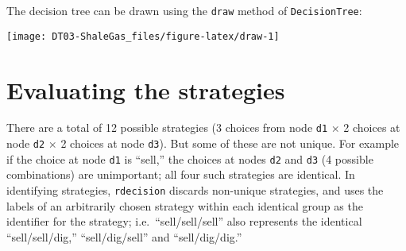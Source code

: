 \documentclass[
]{article}
\newenvironment{Shaded}{\begin{snugshade}}{\end{snugshade}}
\newcommand{\AttributeTok}[1]{\textcolor[rgb]{0.77,0.63,0.00}{#1}}
\newcommand{\CommentTok}[1]{\textcolor[rgb]{0.56,0.35,0.01}{\textit{#1}}}
\newcommand{\DecValTok}[1]{\textcolor[rgb]{0.00,0.00,0.81}{#1}}
\newcommand{\FunctionTok}[1]{\textcolor[rgb]{0.00,0.00,0.00}{#1}}
\newcommand{\NormalTok}[1]{#1}
\newcommand{\OtherTok}[1]{\textcolor[rgb]{0.56,0.35,0.01}{#1}}
\newcommand{\SpecialCharTok}[1]{\textcolor[rgb]{0.00,0.00,0.00}{#1}}
\newcommand{\StringTok}[1]{\textcolor[rgb]{0.31,0.60,0.02}{#1}}
\begin{document}
\begin{Shaded}
\end{Shaded}

The decision tree can be drawn using the \texttt{draw} method of
\texttt{DecisionTree}:

\begin{center}\texttt{[image: DT03-ShaleGas\_files/figure-latex/draw-1]} \end{center}

\hypertarget{evaluating-the-strategies}{%
\section{Evaluating the strategies}\label{evaluating-the-strategies}}

There are a total of 12 possible strategies (3 choices from node
\texttt{d1} \(\times\) 2 choices at node \texttt{d2} \(\times\) 2
choices at node \texttt{d3}). But some of these are not unique. For
example if the choice at node \texttt{d1} is ``sell,'' the choices at
nodes \texttt{d2} and \texttt{d3} (4 possible combinations) are
unimportant; all four such strategies are identical. In identifying
strategies, \texttt{rdecision} discards non-unique strategies, and uses
the labels of an arbitrarily chosen strategy within each identical group
as the identifier for the strategy; i.e.~``sell/sell/sell'' also
represents the identical ``sell/sell/dig,'' ``sell/dig/sell'' and
``sell/dig/dig.''
\end{document}
